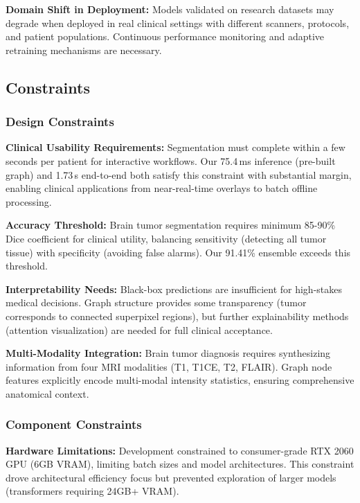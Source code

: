 \documentclass{article}
\begin{document}
\textbf{Domain Shift in Deployment:} Models validated on research datasets may degrade when deployed in real clinical settings with different scanners, protocols, and patient populations. Continuous performance monitoring and adaptive retraining mechanisms are necessary.


\subsection{Constraints}

\subsubsection{Design Constraints}

\textbf{Clinical Usability Requirements:} Segmentation must complete within a few seconds per patient for interactive workflows. Our 75.4\,ms inference (pre-built graph) and 1.73\,s end-to-end both satisfy this constraint with substantial margin, enabling clinical applications from near-real-time overlays to batch offline processing.

\textbf{Accuracy Threshold:} Brain tumor segmentation requires minimum 85-90\% Dice coefficient for clinical utility, balancing sensitivity (detecting all tumor tissue) with specificity (avoiding false alarms). Our 91.41\% ensemble exceeds this threshold.

\textbf{Interpretability Needs:} Black-box predictions are insufficient for high-stakes medical decisions. Graph structure provides some transparency (tumor corresponds to connected superpixel regions), but further explainability methods (attention visualization) are needed for full clinical acceptance.

\textbf{Multi-Modality Integration:} Brain tumor diagnosis requires synthesizing information from four MRI modalities (T1, T1CE, T2, FLAIR). Graph node features explicitly encode multi-modal intensity statistics, ensuring comprehensive anatomical context.

\subsubsection{Component Constraints}

\textbf{Hardware Limitations:} Development constrained to consumer-grade RTX 2060 GPU (6GB VRAM), limiting batch sizes and model architectures. This constraint drove architectural efficiency focus but prevented exploration of larger models (transformers requiring 24GB+ VRAM).
\end{document}
